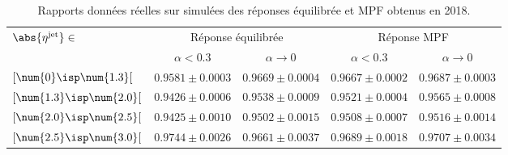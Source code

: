 \begin{table}[h]
\centering
\begin{tabular}{lcccc}
\toprule
\multirow{2}{*}{$\abs{\eta^\text{jet}}\in$} & \multicolumn{2}{c}{Réponse équilibrée} & \multicolumn{2}{c}{Réponse MPF} \\
\cmidrule(lr){2-3}\cmidrule(lr){4-5}
 & $\alpha<\num{0.3}$ & $\alpha\to0$ & $\alpha<\num{0.3}$ & $\alpha\to0$\\
\midrule
$[\num{0}\isp \num{1.3}[$ & $\num{0.9581}\pm\num{0.0003}$ & $\num{0.9669}\pm\num{0.0004}$ & $\num{0.9667}\pm\num{0.0002}$ & $\num{0.9687}\pm\num{0.0003}$ \\
$[\num{1.3}\isp \num{2.0}[$ & $\num{0.9426}\pm\num{0.0006}$ & $\num{0.9538}\pm\num{0.0009}$ & $\num{0.9521}\pm\num{0.0004}$ & $\num{0.9565}\pm\num{0.0008}$ \\
$[\num{2.0}\isp \num{2.5}[$ & $\num{0.9425}\pm\num{0.0010}$ & $\num{0.9502}\pm\num{0.0015}$ & $\num{0.9508}\pm\num{0.0007}$ & $\num{0.9516}\pm\num{0.0014}$ \\
$[\num{2.5}\isp \num{3.0}[$ & $\num{0.9744}\pm\num{0.0026}$ & $\num{0.9661}\pm\num{0.0037}$ & $\num{0.9689}\pm\num{0.0018}$ & $\num{0.9707}\pm\num{0.0034}$ \\
\bottomrule
\end{tabular}
\caption[Rapports des réponses équilibrée et MPF obtenus en 2018.]{Rapports données réelles sur simulées des réponses équilibrée et MPF obtenus en 2018.}
\label{tab-responses_recap_table_2018ABCD}
\end{table}